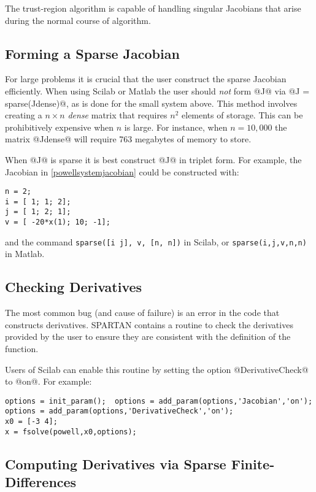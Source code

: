 \documentclass[10pt]{article}
\newcommand{\solverf}{\sffamily}
\newcommand{\matlab}{{\sc Matlab}}
\newcommand{\scilab}{{\sc Scilab}}
\newcommand{\spartan}{{\solverf SPARTAN}}
\begin{document}
The trust-region algorithm is capable of handling singular Jacobians
that arise during the normal course of algorithm.

\subsection*{Forming a Sparse Jacobian}

For large problems it is crucial that the user construct the sparse
Jacobian efficiently. When using \scilab{} or \matlab{} the user should
\emph{not} form @J@ via @J = sparse(Jdense)@, as is done for the small
system above. This method involves creating a $n \times n$
\emph{dense} matrix that requires $n^2$ elements of storage. This can
be prohibitively expensive when $n$ is large. For instance, when $n =
10,000$ the matrix @Jdense@ will require 763 megabytes of
memory to store.

When @J@ is sparse it is best construct @J@ in triplet form. For
example, the Jacobian in \eqref{powellsystemjacobian} could be
constructed with:
\begin{Verbatim}[fontsize=\small]
n = 2; 
i = [ 1; 1; 2];
j = [ 1; 2; 1];
v = [ -20*x(1); 10; -1];
\end{Verbatim}
and the command {\tt sparse([i j], v, [n, n])} in \scilab{}, or 
{\tt sparse(i,j,v,n,n)} in \matlab{}.

\subsection*{Checking Derivatives}
 
The most common bug (and cause of failure) is an error in the code
that constructs derivatives. \spartan{} contains a routine to check
the derivatives provided by the user to ensure they are consistent
with the definition of the function.

Users of \scilab{} can enable this routine by setting the 
option @DerivativeCheck@ to @on@.  For example:
\begin{Verbatim}[fontsize=\small]
options = init_param();  options = add_param(options,'Jacobian','on'); 
options = add_param(options,'DerivativeCheck','on');
x0 = [-3 4]; 
x = fsolve(powell,x0,options);
\end{Verbatim}


\subsection*{Computing Derivatives via Sparse Finite-Differences}
\end{document}
